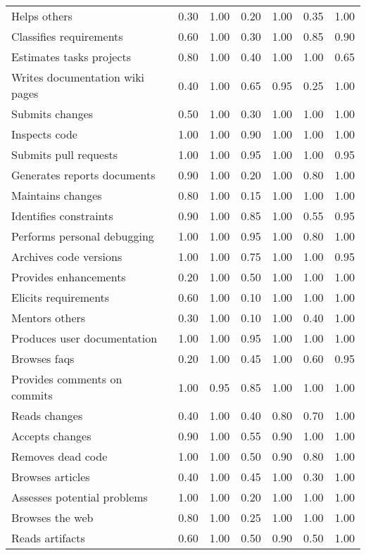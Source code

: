 \begin{tabular}{lrrrrrr}
Helps others & 0.30 & 1.00 & 0.20 & 1.00 & 0.35 & 1.00 \\
Classifies requirements & 0.60 & 1.00 & 0.30 & 1.00 & 0.85 & 0.90 \\
Estimates tasks projects & 0.80 & 1.00 & 0.40 & 1.00 & 1.00 & 0.65 \\
Writes documentation wiki pages & 0.40 & 1.00 & 0.65 & 0.95 & 0.25 & 1.00 \\
Submits changes & 0.50 & 1.00 & 0.30 & 1.00 & 1.00 & 1.00 \\
Inspects code & 1.00 & 1.00 & 0.90 & 1.00 & 1.00 & 1.00 \\
Submits pull requests & 1.00 & 1.00 & 0.95 & 1.00 & 1.00 & 0.95 \\
Generates reports documents & 0.90 & 1.00 & 0.20 & 1.00 & 0.80 & 1.00 \\
Maintains changes & 0.80 & 1.00 & 0.15 & 1.00 & 1.00 & 1.00 \\
Identifies constraints & 0.90 & 1.00 & 0.85 & 1.00 & 0.55 & 0.95 \\
Performs personal debugging & 1.00 & 1.00 & 0.95 & 1.00 & 0.80 & 1.00 \\
Archives code versions & 1.00 & 1.00 & 0.75 & 1.00 & 1.00 & 0.95 \\
Provides enhancements & 0.20 & 1.00 & 0.50 & 1.00 & 1.00 & 1.00 \\
Elicits requirements & 0.60 & 1.00 & 0.10 & 1.00 & 1.00 & 1.00 \\
Mentors others & 0.30 & 1.00 & 0.10 & 1.00 & 0.40 & 1.00 \\
Produces user documentation & 1.00 & 1.00 & 0.95 & 1.00 & 1.00 & 1.00 \\
Browses faqs & 0.20 & 1.00 & 0.45 & 1.00 & 0.60 & 0.95 \\
Provides comments on commits & 1.00 & 0.95 & 0.85 & 1.00 & 1.00 & 1.00 \\
Reads changes & 0.40 & 1.00 & 0.40 & 0.80 & 0.70 & 1.00 \\
Accepts changes & 0.90 & 1.00 & 0.55 & 0.90 & 1.00 & 1.00 \\
Removes dead code & 1.00 & 1.00 & 0.50 & 0.90 & 0.80 & 1.00 \\
Browses articles & 0.40 & 1.00 & 0.45 & 1.00 & 0.30 & 1.00 \\
Assesses potential problems & 1.00 & 1.00 & 0.20 & 1.00 & 1.00 & 1.00 \\
Browses the web & 0.80 & 1.00 & 0.25 & 1.00 & 1.00 & 1.00 \\
Reads artifacts & 0.60 & 1.00 & 0.50 & 0.90 & 0.50 & 1.00 \\

\end{tabular}
